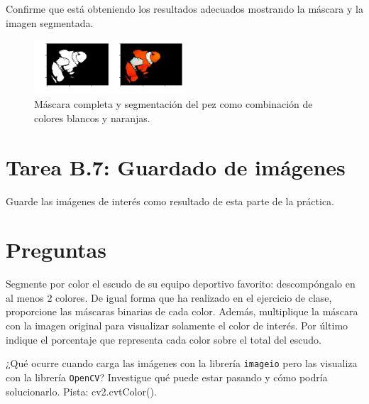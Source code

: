 Confirme que está obteniendo los resultados adecuados mostrando la máscara y la imagen segmentada.


\begin{figure}[h]
    \centering
    \includegraphics[width=0.5\textwidth]{Lab_1/template/figures/output.png}
    \caption{Máscara completa y segmentación del pez como combinación de colores blancos y naranjas.}
    \label{fig:fish_output}
\end{figure}


\section*{Tarea B.7: Guardado de imágenes}

Guarde las imágenes de interés como resultado de esta parte de la práctica.

\section*{Preguntas}

\vspace{5mm}
\begin{tcolorbox}[colback=gray!10, colframe=gray!30, coltitle=black, title=Pregunta B.1, halign=left]
Segmente por color el escudo de su equipo deportivo favorito: descompóngalo en al menos 2 colores. De igual forma que ha realizado en el ejercicio de clase, proporcione las máscaras binarias de cada color. Además, multiplique la máscara con la imagen original para visualizar solamente el color de interés. Por último indique el porcentaje que representa cada color sobre el total del escudo.
\end{tcolorbox}

\vspace{5mm}
\begin{tcolorbox}[colback=gray!10, colframe=gray!30, coltitle=black, title=Pregunta B.2, halign=left]
¿Qué ocurre cuando carga las imágenes con la librería \texttt{imageio} pero las visualiza con la librería \texttt{OpenCV}? Investigue qué puede estar pasando y cómo podría solucionarlo. Pista: cv2.cvtColor().
\end{tcolorbox}